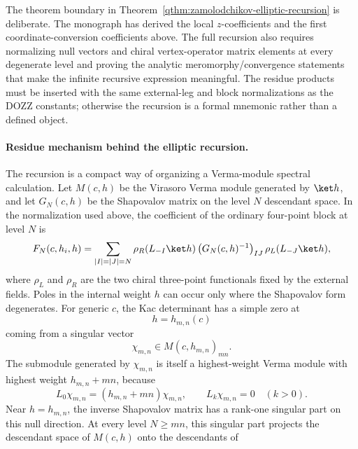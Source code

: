 The theorem boundary in
Theorem~\ref{qthm:zamolodchikov-elliptic-recursion} is deliberate.  The
monograph has derived the local \(z\)-coefficients and the first
coordinate-conversion coefficients above.  The full recursion also requires
normalizing null vectors and chiral vertex-operator matrix elements at every
degenerate level and proving the analytic meromorphy/convergence statements
that make the infinite recursive expression meaningful.  The residue products
must be inserted with the same external-leg and block normalizations as the
DOZZ constants; otherwise the recursion is a formal mnemonic rather than a
defined object.

\paragraph{Residue mechanism behind the elliptic recursion.}
The recursion is a compact way of organizing a Verma-module spectral
calculation.  Let \(M(c,h)\) be the Virasoro Verma module generated by
\(\ket h\), and let \(G_N(c,h)\) be the Shapovalov matrix on the level
\(N\) descendant space.  In the normalization used above, the coefficient of
the ordinary four-point block at level \(N\) is
\begin{equation}
  F_N(c,h_i,h)
  =
  \sum_{|I|=|J|=N}
  \rho_R(L_{-I}\ket h)\,
  \bigl(G_N(c,h)^{-1}\bigr)_{IJ}\,
  \rho_L(L_{-J}\ket h),
  \label{eq:liouville-block-gram-projector-general}
\end{equation}
where \(\rho_L\) and \(\rho_R\) are the two chiral three-point functionals
fixed by the external fields.  Poles in the internal weight \(h\) can occur
only where the Shapovalov form degenerates.  For generic \(c\), the Kac
determinant has a simple zero at
\begin{equation}
  h=h_{m,n}(c)
\end{equation}
coming from a singular vector
\begin{equation}
  \chi_{m,n}\in M(c,h_{m,n})_{mn}.
\end{equation}
The submodule generated by \(\chi_{m,n}\) is itself a highest-weight Verma
module with highest weight \(h_{m,n}+mn\), because
\begin{equation}
  L_0\chi_{m,n}=(h_{m,n}+mn)\chi_{m,n},
  \qquad
  L_k\chi_{m,n}=0\quad(k>0).
\end{equation}
Near \(h=h_{m,n}\), the inverse Shapovalov matrix has a rank-one singular
part on this null direction.  At every level \(N\ge mn\), this singular part
projects the descendant space of \(M(c,h)\) onto the descendants of
